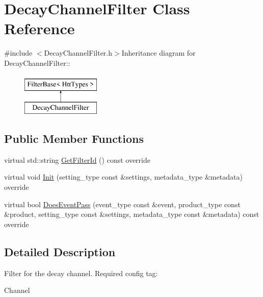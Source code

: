 \hypertarget{classDecayChannelFilter}{
\section{DecayChannelFilter Class Reference}
\label{classDecayChannelFilter}
}


{\ttfamily \#include $<$DecayChannelFilter.h$>$}Inheritance diagram for DecayChannelFilter::\begin{figure}[H]
\begin{center}
\leavevmode
\includegraphics[height=2cm]{classDecayChannelFilter}
\end{center}
\end{figure}
\subsection*{Public Member Functions}
\begin{DoxyCompactItemize}
\item 
virtual std::string \hyperlink{classDecayChannelFilter_a35656f3ba0c09ccd8297a5b432741deb}{GetFilterId} () const override
\item 
virtual void \hyperlink{classDecayChannelFilter_a3ef44e4cca191eeacb2a3c898293ddab}{Init} (setting\_\-type const \&settings, metadata\_\-type \&metadata) override
\item 
virtual bool \hyperlink{classDecayChannelFilter_a02700352e9691d39dfc16d5dd0391093}{DoesEventPass} (event\_\-type const \&event, product\_\-type const \&product, setting\_\-type const \&settings, metadata\_\-type const \&metadata) const override
\end{DoxyCompactItemize}


\subsection{Detailed Description}
Filter for the decay channel. Required config tag:
\begin{DoxyItemize}
\item Channel 
\end{DoxyItemize}

